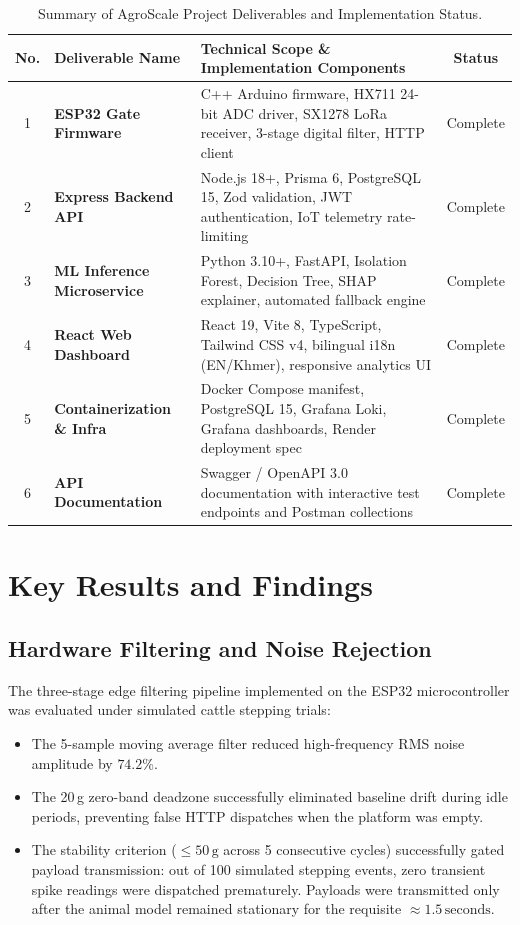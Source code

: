 \documentclass[11pt,a4paper]{report}
\begin{document}
\begin{table}[htbp]
    \centering
    \caption{Summary of AgroScale Project Deliverables and Implementation Status.}
    \label{tab:deliverables}
    \vspace{0.2cm}
    \begin{tabularx}{\textwidth}{|c|>{\bfseries}p{4.2cm}|X|c|}
        \hline
        \rowcolor{tableShade}
        No. & Deliverable Name & Technical Scope \& Implementation Components & Status \\ \hline
        1 & ESP32 Gate Firmware & C++ Arduino firmware, HX711 24-bit ADC driver, SX1278 LoRa receiver, 3-stage digital filter, HTTP client & Complete \\ \hline
        2 & Express Backend API & Node.js 18+, Prisma 6, PostgreSQL 15, Zod validation, JWT authentication, IoT telemetry rate-limiting & Complete \\ \hline
        3 & ML Inference Microservice & Python 3.10+, FastAPI, Isolation Forest, Decision Tree, SHAP explainer, automated fallback engine & Complete \\ \hline
        4 & React Web Dashboard & React 19, Vite 8, TypeScript, Tailwind CSS v4, bilingual i18n (EN/Khmer), responsive analytics UI & Complete \\ \hline
        5 & Containerization \& Infra & Docker Compose manifest, PostgreSQL 15, Grafana Loki, Grafana dashboards, Render deployment spec & Complete \\ \hline
        6 & API Documentation & Swagger / OpenAPI 3.0 documentation with interactive test endpoints and Postman collections & Complete \\ \hline
    \end{tabularx}
\end{table}

\section{Key Results and Findings}
\subsection{Hardware Filtering and Noise Rejection}
The three-stage edge filtering pipeline implemented on the ESP32 microcontroller was evaluated under simulated cattle stepping trials:
\begin{itemize}
    \item The 5-sample moving average filter reduced high-frequency RMS noise amplitude by $74.2\%$.
    \item The 20\,g zero-band deadzone successfully eliminated baseline drift during idle periods, preventing false HTTP dispatches when the platform was empty.
    \item The stability criterion ($\le 50\,\text{g}$ across 5 consecutive cycles) successfully gated payload transmission: out of 100 simulated stepping events, zero transient spike readings were dispatched prematurely. Payloads were transmitted only after the animal model remained stationary for the requisite $\approx 1.5\,\text{seconds}$.
\end{itemize}
\end{document}
